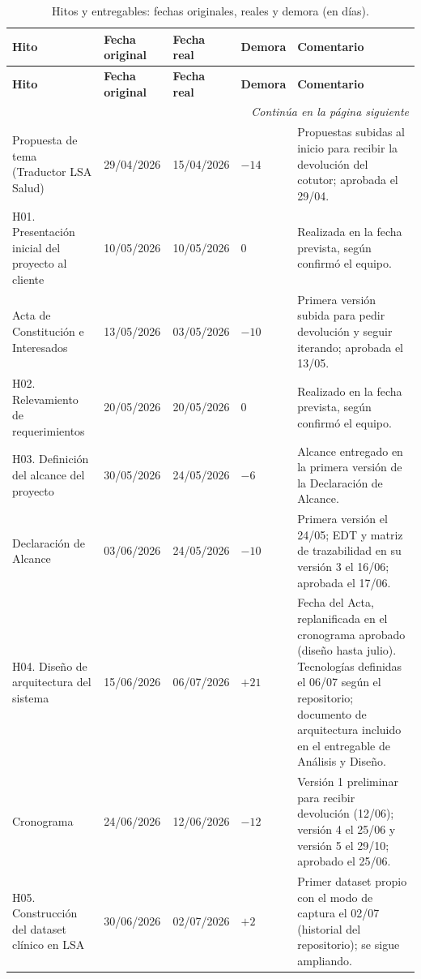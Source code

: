 {\footnotesize
\begin{longtable}{@{}p{3.4cm}p{1.85cm}p{1.85cm}p{1.35cm}p{5.7cm}@{}}
\caption{Hitos y entregables: fechas originales, reales y demora (en días).}\label{tab:hitos}\\
\toprule
\textbf{Hito} & \textbf{Fecha original} & \textbf{Fecha real} & \textbf{Demora} & \textbf{Comentario} \\
\midrule
\endfirsthead
\toprule
\textbf{Hito} & \textbf{Fecha original} & \textbf{Fecha real} & \textbf{Demora} & \textbf{Comentario} \\
\midrule
\endhead
\midrule
\multicolumn{5}{r}{\emph{Continúa en la página siguiente}}\\
\endfoot
\bottomrule
\endlastfoot
Propuesta de tema (Traductor LSA Salud) & 29/04/2026 & 15/04/2026 & $-14$ & Propuestas subidas al inicio para recibir la devolución del cotutor; aprobada el 29/04. \\
H01. Presentación inicial del proyecto al cliente & 10/05/2026 & 10/05/2026 & 0 & Realizada en la fecha prevista, según confirmó el equipo. \\
Acta de Constitución e Interesados & 13/05/2026 & 03/05/2026 & $-10$ & Primera versión subida para pedir devolución y seguir iterando; aprobada el 13/05. \\
H02. Relevamiento de requerimientos & 20/05/2026 & 20/05/2026 & 0 & Realizado en la fecha prevista, según confirmó el equipo. \\
H03. Definición del alcance del proyecto & 30/05/2026 & 24/05/2026 & $-6$ & Alcance entregado en la primera versión de la Declaración de Alcance. \\
Declaración de Alcance & 03/06/2026 & 24/05/2026 & $-10$ & Primera versión el 24/05; EDT y matriz de trazabilidad en su versión 3 el 16/06; aprobada el 17/06. \\
H04. Diseño de arquitectura del sistema & 15/06/2026 & 06/07/2026 & $+21$ & Fecha del Acta, replanificada en el cronograma aprobado (diseño hasta julio). Tecnologías definidas el 06/07 según el repositorio; documento de arquitectura incluido en el entregable de Análisis y Diseño. \\
Cronograma & 24/06/2026 & 12/06/2026 & $-12$ & Versión 1 preliminar para recibir devolución (12/06); versión 4 el 25/06 y versión 5 el 29/10; aprobado el 25/06. \\
H05. Construcción del dataset clínico en LSA & 30/06/2026 & 02/07/2026 & $+2$ & Primer dataset propio con el modo de captura el 02/07 (historial del repositorio); se sigue ampliando. \\

\end{longtable}}
